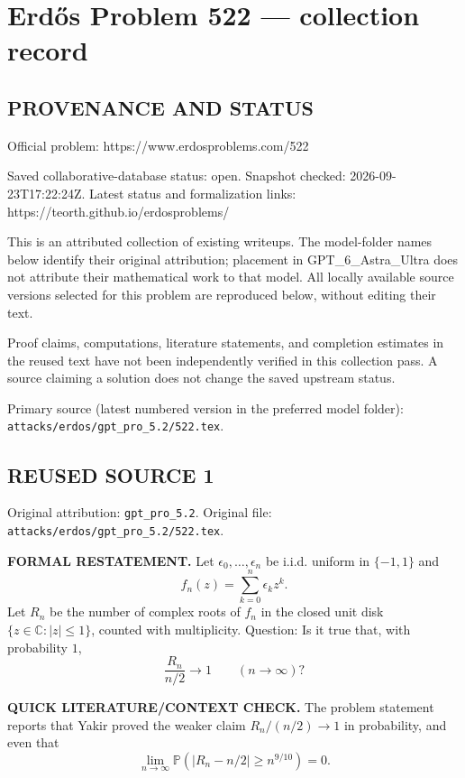 \section*{Erd\H{o}s Problem 522 --- collection record}

\subsection*{PROVENANCE AND STATUS}
Official problem: https://www.erdosproblems.com/522

Saved collaborative-database status: open.
Snapshot checked: 2026-09-23T17:22:24Z.
Latest status and formalization links: https://teorth.github.io/erdosproblems/

This is an attributed collection of existing writeups. The model-folder names below identify their original attribution; placement in GPT\_6\_Astra\_Ultra does not attribute their mathematical work to that model. All locally available source versions selected for this problem are reproduced below, without editing their text.

Proof claims, computations, literature statements, and completion estimates in the reused text have not been independently verified in this collection pass. A source claiming a solution does not change the saved upstream status.

Primary source (latest numbered version in the preferred model folder): \texttt{attacks/erdos/gpt\_pro\_5.2/522.tex}.

\subsection*{REUSED SOURCE 1}
Original attribution: \texttt{gpt\_pro\_5.2}.
Original file: \texttt{attacks/erdos/gpt\_pro\_5.2/522.tex}.


\noindent\textbf{FORMAL RESTATEMENT.}
Let $\epsilon_0,\dots,\epsilon_n$ be i.i.d. uniform in $\{-1,1\}$ and
\[f_n(z)=\sum_{k=0}^n \epsilon_k z^k.
\]
Let $R_n$ be the number of complex roots of $f_n$ in the closed unit disk $\{z\in\mathbb C:|z|\le 1\}$, counted with multiplicity.
Question: Is it true that, with probability $1$,
\[\frac{R_n}{n/2}\to 1\qquad (n\to\infty)?
\]

\bigskip
\noindent\textbf{QUICK LITERATURE/CONTEXT CHECK.}
The problem statement reports that Yakir proved the weaker claim $R_n/(n/2)\to 1$ in probability, and even that
\[\lim_{n\to\infty}\mathbb P(|R_n-n/2|\ge n^{9/10})=0.
\]

